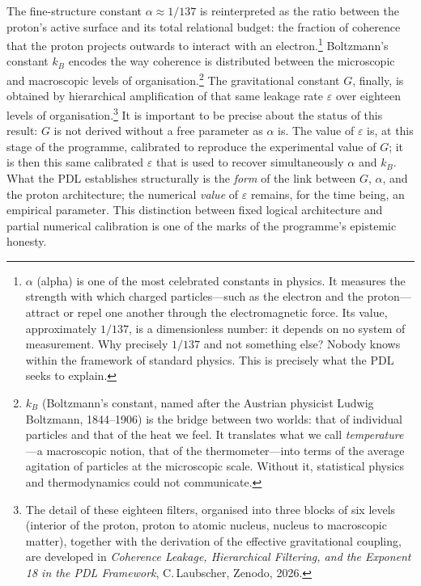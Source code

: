 \documentclass[12pt, a4paper, openright]{book}
\begin{document}
The fine-structure constant $\alpha \approx 1/137$ is reinterpreted as the ratio between the proton's active surface and its total relational budget: the fraction of coherence that the proton projects outwards to interact with an electron.\footnote{$\alpha$ (alpha) is one of the most celebrated constants in physics. It measures the strength with which charged particles---such as the electron and the proton---attract or repel one another through the electromagnetic force. Its value, approximately $1/137$, is a dimensionless number: it depends on no system of measurement. Why precisely $1/137$ and not something else? Nobody knows within the framework of standard physics. This is precisely what the PDL seeks to explain.} Boltzmann's constant $k_B$ encodes the way coherence is distributed between the microscopic and macroscopic levels of organisation.\footnote{$k_B$ (Boltzmann's constant, named after the Austrian physicist Ludwig Boltzmann, 1844--1906) is the bridge between two worlds: that of individual particles and that of the heat we feel. It translates what we call \emph{temperature}---a macroscopic notion, that of the thermometer---into terms of the average agitation of particles at the microscopic scale. Without it, statistical physics and thermodynamics could not communicate.} The gravitational constant $G$, finally, is obtained by hierarchical amplification of that same leakage rate $\varepsilon$ over eighteen levels of organisation.\footnote{The detail of these eighteen filters, organised into three blocks of six levels (interior of the proton, proton to atomic nucleus, nucleus to macroscopic matter), together with the derivation of the effective gravitational coupling, are developed in \textit{Coherence Leakage, Hierarchical Filtering, and the Exponent\,18 in the PDL Framework}, C.\,Laubscher, Zenodo, 2026.} It is important to be precise about the status of this result: $G$ is not derived without a free parameter as $\alpha$ is. The value of $\varepsilon$ is, at this stage of the programme, calibrated to reproduce the experimental value of $G$; it is then this same calibrated $\varepsilon$ that is used to recover simultaneously $\alpha$ and $k_B$. What the PDL establishes structurally is the \emph{form} of the link between $G$, $\alpha$, and the proton architecture; the numerical \emph{value} of $\varepsilon$ remains, for the time being, an empirical parameter. This distinction between fixed logical architecture and partial numerical calibration is one of the marks of the programme's epistemic honesty.

\medskip
\end{document}
